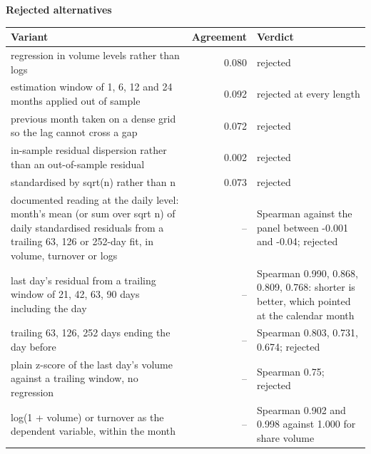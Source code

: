 \documentclass[11pt]{article}
\begin{document}
\textbf{Rejected alternatives}\\[2pt]
{\small\begin{longtable}{@{}p{9.6cm}rp{4.3cm}@{}}
\toprule Variant & Agreement & Verdict\\\midrule\endhead
regression in volume levels rather than logs & 0.080 & rejected\\
estimation window of 1, 6, 12 and 24 months applied out of sample & 0.092 & rejected at every length\\
previous month taken on a dense grid so the lag cannot cross a gap & 0.072 & rejected\\
in-sample residual dispersion rather than an out-of-sample residual & 0.002 & rejected\\
standardised by sqrt(n) rather than n & 0.073 & rejected\\
documented reading at the daily level: month's mean (or sum over sqrt n) of daily standardised residuals from a trailing 63, 126 or 252-day fit, in volume, turnover or logs & -- & Spearman against the panel between -0.001 and -0.04; rejected\\
last day's residual from a trailing window of 21, 42, 63, 90 days including the day & -- & Spearman 0.990, 0.868, 0.809, 0.768: shorter is better, which pointed at the calendar month\\
trailing 63, 126, 252 days ending the day before & -- & Spearman 0.803, 0.731, 0.674; rejected\\
plain z-score of the last day's volume against a trailing window, no regression & -- & Spearman 0.75; rejected\\
log(1 + volume) or turnover as the dependent variable, within the month & -- & Spearman 0.902 and 0.998 against 1.000 for share volume\\
\bottomrule\end{longtable}}
\end{document}
